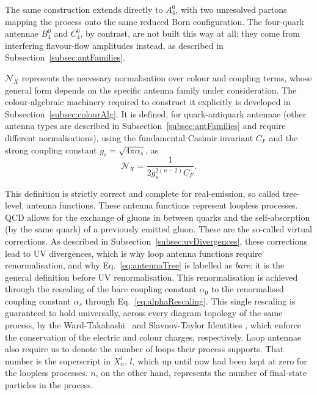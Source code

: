 The same construction extends directly to $A_4^0$, with two unresolved partons
mapping the process onto the same reduced Born configuration. The four-quark
antennae $B_4^0$ and $C_4^0$, by contrast, are not built this way at all: they
come from interfering flavour-flow amplitudes instead, as described in
Subsection~\ref{subsec:antFamilies}.

$\mathcal N_X$ represents the necessary normalisation over colour and coupling
terms, whose general form depends on the specific antenna family under consideration.
The colour-algebraic machinery required to construct it explicitly is developed 
in Subsection~\ref{subsec:colourAlg}. It is defined, for quark-antiquark antennae
(other antenna types are described in Subsection~\ref{subsec:antFamilies} and require
different normalisations), using the fundamental Casimir
invariant $C_F$ and the strong coupling constant $g_s=\sqrt{4\pi\alpha_s}$, as
\begin{equation}
    \mathcal N_X=\frac{1}{2g_s^{2(n-2)}C_F}.
\end{equation}

This definition is strictly correct and complete for real-emission, so called
tree-level, antenna functions. These antenna functions represent loopless
processes. QCD allows for the exchange of gluons in between quarks and the 
self-absorption (by the same quark) of a previously emitted gluon. These are the 
so-called virtual corrections. As described in Subsection~\ref{subsec:uvDivergences},
these corrections lead to UV divergences, which is why loop antenna functions
require renormalisation, and why Eq.~\eqref{eq:antennaTree} is
labelled as \textit{bare}: it is the general definition before UV renormalisation.
This renormalisation is achieved through the
rescaling of the bare coupling constant $\alpha_0$ to the renormalised coupling
constant $\alpha_s$ through Eq.~\eqref{eq:alphaRescaling}. This single rescaling is
guaranteed to hold universally, across every diagram topology of the same process,
by the Ward-Takahashi~\cite{Ward:1950xp, Takahashi:1957xn} and Slavnov-Taylor Identities
\cite{Taylor:1971ff, Slavnov:1972fg}, which enforce the conservation of the
electric and colour charges, respectively. Loop antennae also require us to denote the number
of loops their process supports. That number is the superscript in $X_n^l$, $l$,
which up until now had been kept at zero for the loopless processes. $n$, on the 
other hand, represents the number of final-state particles in the process.

